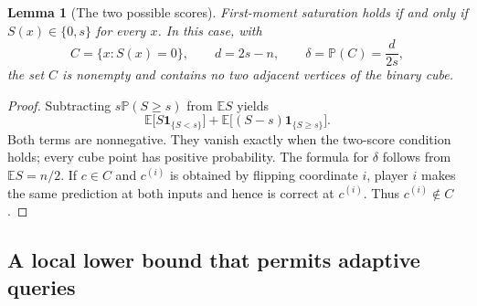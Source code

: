 \documentclass[11pt,letterpaper]{article}
\newtheorem{lemma}[theorem]{Lemma}
\theoremstyle{definition}
\newcommand{\E}{\mathbb E}
\newcommand{\Prb}{\mathbb P}
\newcommand{\indic}[1]{\mathbf 1_{\{#1\}}}
\begin{document}
\begin{lemma}[The two possible scores]\label{mbg:insp:lem:fin-two-scores}
First-moment saturation holds if and only if
$S(x)\in\{0,s\}$ for every $x$.  In this case, with
\[
 C=\{x:S(x)=0\},\qquad d=2s-n,\qquad
 \delta=\Prb(C)=\frac{d}{2s},
\]
the set $C$ is nonempty and contains no two adjacent vertices of the
binary cube.
\end{lemma}
\begin{proof}
Subtracting $s\Prb(S\geq s)$ from $\E S$ yields
\[
 \E\bigl[S\indic{S<s}\bigr]+
 \E\bigl[(S-s)\indic{S\geq s}\bigr].
\]
Both terms are nonnegative.  They vanish exactly when the two-score
condition holds; every cube point has positive probability.  The formula
for $\delta$ follows from $\E S=n/2$.  If $c\in C$ and $c^{(i)}$ is
obtained by flipping coordinate $i$, player $i$ makes the same prediction
at both inputs and hence is correct at $c^{(i)}$.  Thus $c^{(i)}\notin C$.
\end{proof}

\subsection{A local lower bound that permits adaptive queries}
\end{document}
